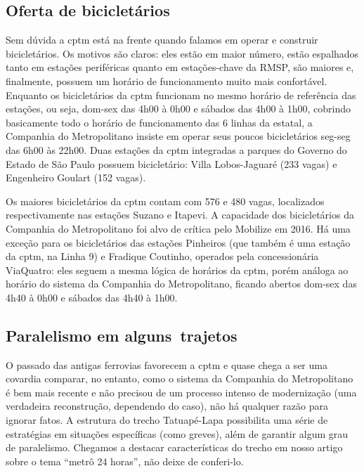 \documentclass[11pt,fleqn]{book} %
\begin{document}
\subsection{Oferta de bicicletários}

Sem dúvida a \gls{cptm} está na frente quando falamos em operar e construir bicicletários. Os motivos são claros: eles estão em maior número, estão espalhados tanto em estações periféricas quanto em estações-chave da RMSP, são maiores e, finalmente, possuem um horário de funcionamento muito mais confortável. Enquanto os bicicletários da \gls{cptm} funcionam no mesmo horário de referência das estações, ou seja, dom-sex das 4h00 à 0h00 e sábados das 4h00 à 1h00, cobrindo basicamente todo o horário de funcionamento das 6 linhas da estatal, a Companhia do Metropolitano insiste em operar seus poucos bicicletários seg-seg das 6h00 às 22h00. Duas estações da \gls{cptm} integradas a parques do Governo do Estado de São Paulo possuem bicicletário: Villa Lobos-Jaguaré (233 vagas) e Engenheiro Goulart (152 vagas).

Os maiores bicicletários da \gls{cptm} contam com 576 e 480 vagas, localizados respectivamente nas estações Suzano e Itapevi. A capacidade dos bicicletários da Companhia do Metropolitano foi alvo de crítica pelo Mobilize em 2016. Há uma exceção para os bicicletários das estações Pinheiros (que também é uma estação da \gls{cptm}, na Linha 9) e Fradique Coutinho, operados pela concessionária ViaQuatro: eles seguem a mesma lógica de horários da \gls{cptm}, porém análoga ao horário do sistema da Companhia do Metropolitano, ficando abertos dom-sex das 4h40 à 0h00 e sábados das 4h40 à 1h00.

\subsection{Paralelismo em alguns trajetos}


O passado das antigas ferrovias favorecem a \gls{cptm} e quase chega a ser uma covardia comparar, no entanto, como o sistema da Companhia do Metropolitano é bem mais recente e não precisou de um processo intenso de modernização (uma verdadeira reconstrução, dependendo do caso), não há qualquer razão para ignorar fatos. A estrutura do trecho Tatuapé-Lapa possibilita uma série de estratégias em situações específicas (como greves), além de garantir algum grau de paralelismo. Chegamos a destacar características do trecho em nosso artigo sobre o tema \enquote{metrô 24 horas}, não deixe de conferi-lo.
\end{document}
